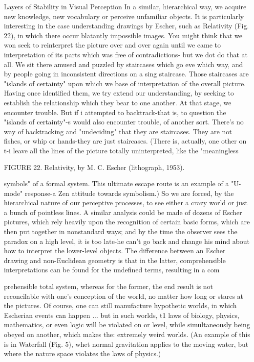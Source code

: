 Layers of Stability in Visual Perception In a similar, hierarchical way, we acquire new knowledge, new vocabulary or perceive unfamiliar objects. It is particularly interesting in the case understanding drawings by Escher, such as Relativity (Fig. 22), in which there occur blatantly impossible images. You might think that we won seek to reinterpret the picture over and over again until we came to interpretation of its parts which was free of contradictions- but we dot do that at all. We sit there amused and puzzled by staircases which go eve which way, and by people going in inconsistent directions on a sing staircase. Those staircases are "islands of certainty" upon which we base of interpretation of the overall picture. Having once identified them, we try extend our understanding, by seeking to establish the relationship which they bear to one another. At that stage, we encounter trouble. But if i attempted to backtrack-that is, to question the "islands of certainty"-s would also encounter trouble, of another sort. There's no way of backtracking and "undeciding" that they are staircases. They are not fishes, or whip or hands-they are just staircases. (There is, actually, one other on t-i leave all the lines of the picture totally uninterpreted, like the "meaningless 







FIGURE 22. Relativity, by M. C. Escher (lithograph, 1953). 

symbols" of a formal system. This ultimate escape route is an example of a "U-mode" response-a Zen attitude towards symbolism.) So we are forced, by the hierarchical nature of our perceptive processes, to see either a crazy world or just a bunch of pointless lines. A similar analysis could be made of dozens of Escher pictures, which rely heavily upon the recognition of certain basic forms, which are then put together in nonstandard ways; and by the time the observer sees the paradox on a high level, it is too late-he can't go back and change his mind about how to interpret the lower-level objects. The difference between an Escher drawing and non-Euclidean geometry is that in the latter, comprehensible interpretations can be found for the undefined terms, resulting in a com 







prehensible total system, whereas for the former, the end result is not reconcilable with one's conception of the world, no matter how long or stares at the pictures. Of course, one can still manufacture hypothetic worlds, in which Escherian events can happen ... but in such worlds, t1 laws of biology, physics, mathematics, or even logic will be violated on or level, while simultaneously being obeyed on another, which makes the: extremely weird worlds. (An example of this is in Waterfall (Fig. 5), whet normal gravitation applies to the moving water, but where the nature space violates the laws of physics.) 

